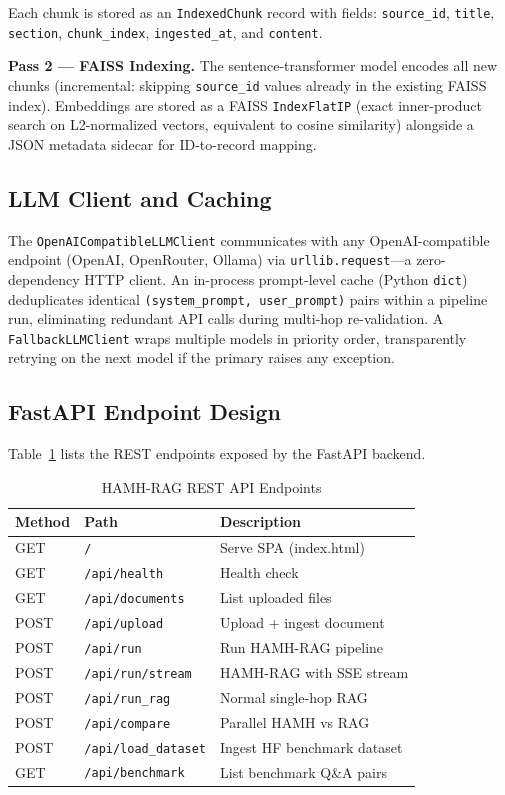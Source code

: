 \documentclass[conference]{IEEEtran}
\begin{document}
Each chunk is stored as an \texttt{IndexedChunk} record with fields:
\texttt{source\_id}, \texttt{title}, \texttt{section},
\texttt{chunk\_index}, \texttt{ingested\_at}, and \texttt{content}.

\textbf{Pass 2 — FAISS Indexing.}  The sentence-transformer model
encodes all new chunks (incremental: skipping \texttt{source\_id}
values already in the existing FAISS index).  Embeddings are stored
as a FAISS \texttt{IndexFlatIP} (exact inner-product search on
L2-normalized vectors, equivalent to cosine similarity) alongside a
JSON metadata sidecar for ID-to-record mapping.

\subsection{LLM Client and Caching}

The \texttt{OpenAICompatibleLLMClient} communicates with any
OpenAI-compatible endpoint (OpenAI, OpenRouter, Ollama) via
\texttt{urllib.request}---a zero-dependency HTTP client.  An
in-process prompt-level cache (Python \texttt{dict}) deduplicates
identical \texttt{(system\_prompt, user\_prompt)} pairs within a
pipeline run, eliminating redundant API calls during multi-hop
re-validation.  A \texttt{FallbackLLMClient} wraps multiple models
in priority order, transparently retrying on the next model if the
primary raises any exception.

\subsection{FastAPI Endpoint Design}

Table~\ref{tab:api} lists the REST endpoints exposed by the
FastAPI backend.

\begin{table}[!t]
\renewcommand{\arraystretch}{1.2}
\caption{HAMH-RAG REST API Endpoints}
\label{tab:api}
\centering
\begin{tabular}{@{}llp{3.5cm}@{}}
\toprule
\textbf{Method} & \textbf{Path} & \textbf{Description} \\
\midrule
GET  & \texttt{/}                  & Serve SPA (index.html) \\
GET  & \texttt{/api/health}        & Health check \\
GET  & \texttt{/api/documents}     & List uploaded files \\
POST & \texttt{/api/upload}        & Upload + ingest document \\
POST & \texttt{/api/run}           & Run HAMH-RAG pipeline \\
POST & \texttt{/api/run/stream}    & HAMH-RAG with SSE stream \\
POST & \texttt{/api/run\_rag}      & Normal single-hop RAG \\
POST & \texttt{/api/compare}       & Parallel HAMH vs RAG \\
POST & \texttt{/api/load\_dataset} & Ingest HF benchmark dataset \\
GET  & \texttt{/api/benchmark}     & List benchmark Q\&A pairs \\
\bottomrule
\end{tabular}
\end{table}
\end{document}
